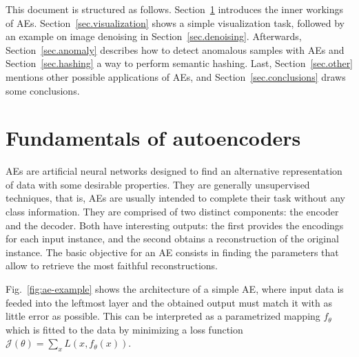 \documentclass[
	fontsize=11pt, %
	twoside=false, %
	open=any, %
	secnumdepth=1, %
]{kaobook}
\begin{document}
This document is structured as follows. Section~\ref{sec.fundamentals} introduces the inner workings of AEs. Section~\ref{sec.visualization} shows a simple visualization task, followed by an example on image denoising in Section~\ref{sec.denoising}. Afterwards, Section~\ref{sec.anomaly} describes how to detect anomalous samples with AEs and Section~\ref{sec.hashing} a way to perform semantic hashing. Last, Section~\ref{sec.other} mentions other possible applications of AEs, and Section~\ref{sec.conclusions} draws some conclusions.

\section{Fundamentals of autoencoders}
\label{sec.fundamentals}

AEs are artificial neural networks designed to find an alternative representation of data with some desirable properties. They are generally unsupervised techniques, that is, AEs are usually intended to complete their task without any class information. They are comprised of two distinct components: the encoder and the decoder. Both have interesting outputs: the first provides the encodings for each input instance, and the second obtains a reconstruction of the original instance. The basic objective for an AE consists in finding the parameters that allow to retrieve the most faithful reconstructions.

Fig.~\ref{fig:ae-example} shows the architecture of a simple AE, where input data is feeded into the leftmost layer and the obtained output must match it with as little error as possible. This can be interpreted as a parametrized mapping $f_{\theta}$ which is fitted to the data by minimizing a loss function $\mathcal J(\theta) = \sum_x L(x,f_{\theta}(x))$.
\end{document}
